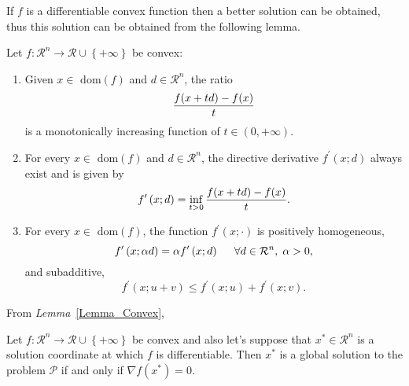 If $f$ is a differentiable convex function then a better solution can be obtained, thus this solution can be obtained from the following lemma.
\begin{lem}\label{Lemma_Convex}
    Let $f : \mathcal{R}^{n}\rightarrow\mathcal{R}\cup\left\{+\infty\right\}$ be convex:
       \begin{enumerate}
          \item Given  $x\in\text{ dom}(f)$ and $d\in\mathcal{R}^{n}$, the ratio
             \begin{displaymath}
                 \displaystyle\frac{f(x+td)-f(x)}{t}
             \end{displaymath}
             is a monotonically increasing function of $t\in\left(0,+\infty\right)$.
          \item For every $x\in\text{ dom}(f)$ and $d\in\mathcal{R}^{n}$, the directive derivative $f^{\prime}\left(x;d\right)$ always exist and is given by
             \begin{displaymath}
                 f^{\prime}\left(x;d\right) = \displaystyle\inf_{t>0} \displaystyle\frac{f(x+td)-f(x)}{t}.
             \end{displaymath}
          \item For every $x\in\text{ dom}(f)$, the function $f^{\prime}\left(x;\cdot\right)$ is positively homogeneous,
             \begin{displaymath}
                 f^{\prime}\left(x;\alpha d\right) = \alpha f^{\prime}\left(x;d\right) \hspace{.5cm} \forall d\in\mathcal{R}^{n},\; \alpha > 0,
             \end{displaymath}
              and subadditive,
             \begin{displaymath}
                 f^{\prime}\left(x;u+v\right) \le f^{\prime}\left(x;u\right) + f^{\prime}\left(x;v\right).
             \end{displaymath}
       \end{enumerate}
\end{lem}
From {\it Lemma}~\ref{Lemma_Convex},
\begin{thm}\label{Theorem_Convex2}
   Let $f:\mathcal{R}^{n}\rightarrow\mathcal{R}\cup\left\{+\infty\right\}$ be convex and also let's suppose that $x^{\ast}\in\mathcal{R}^{n}$ is a solution coordinate at which $f$ is differentiable. Then $x^{\ast}$ is a global solution to the problem $\mathcal{P}$ if and only if $\nabla f\left(x^{\ast}\right)=0$.
\end{thm}

